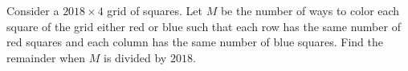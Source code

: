 Consider a $2018\times4$ grid of squares. Let $M$ be the number of ways to color each square of the grid either red or blue such that each row has the same number of red squares and each column has the same number of blue squares. Find the remainder when $M$ is divided by $2018$.